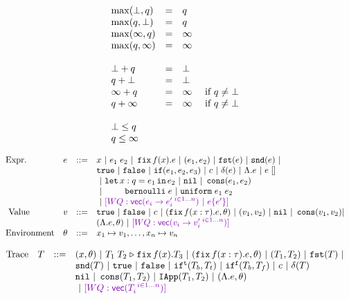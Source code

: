 \[\begin{array}{lcl}
\max(\bot, \nnatbiA) & = & \nnatbiA \\
\max(\nnatbiA, \bot) & = & \nnatbiA \\
\max(\infty, \nnatbiA) & = & \infty \\
\max(\nnatbiA, \infty) & = & \infty \\
\\
%
\bot + \nnatbiA & = & \bot \\
\nnatbiA + \bot & = & \bot \\
\infty + \nnatbiA & = & \infty ~~~~ \mbox{if } \nnatbiA \neq \bot \\
\nnatbiA + \infty & = & \infty ~~~~ \mbox{if } \nnatbiA \neq \bot \\
\\
%
\bot \leq \nnatbiA \\
\nnatbiA \leq \infty
\end{array}
\]

\[\begin{array}{llll}
\mbox{Expr.} & \expr & ::= & x ~|~ \expr_1 \eapp \expr_2 ~|~ \efix f(x).\expr
 ~|~ (\expr_1, \expr_2) ~|~ \eprojl(\expr) ~|~ \eprojr(\expr) ~| \\
%
& & & \etrue ~|~ \efalse ~|~ \eif(\expr_1, \expr_2, \expr_3) ~|~
\econst ~|~ \eop(\expr)  ~|~  {\eilam \expr ~|~ \expr \eapp [] } \\
& & & ~|~  {\elet  x:q = \expr_1 \ein \expr_2 } ~|~ \enil ~|~  \econs (
      \expr_1, \expr_2) \\
& & & ~|~ { ~~~~~~~
 \bernoulli \eapp \expr ~|~ \uniform \eapp \expr_1 \eapp
      \expr_2 } \\
& & & ~|~  \wq{ \mathsf{vec}(\expr_i \to \expr_i'^{\, \, i \in 1\dots n})  ~|~ \expr \{ \expr' \}  } \\\
%
\mbox{Value} & \valr & ::= & \etrue ~|~ \efalse ~|~ \econst ~|~
(\efix f(x:\type).\expr, \env) ~|~ (\valr_1, \valr_2) 
    ~|~ \enil ~|~ \econs (\valr_1, \valr_2) | \\
& & & {(\eilam \expr , \env) } ~|~ \wq{ \mathsf{vec}(\valr_i \to \valr_i'^{\, \, i \in 1\dots n} )  } \\
%
\mbox{Environment} & \env & ::= & x_1 \mapsto \valr_1, \ldots, x_n \mapsto \valr_n
\end{array}\]


\[\begin{array}{llll}
\mbox{Trace} & \tr & ::= &  {(x, \env)} ~|~ \trapp{\tr_1}{\tr_2}{f}{x}{\tr_3} ~|~
{ (\trfix f(x:\type).e, \env) } ~|~ (\tr_1, \tr_2) ~|~ \trprojl(\tr) ~|\\ 
%
& & & \trprojr(\tr) ~|~ \trtrue ~|~ \trfalse ~|~ \trift(\tr_b, \tr_t)
~|~ \triff(\tr_b, \tr_f) ~|~ \trconst ~|~ \trop(\tr) \\
%
& & & \trnil ~|~ \trcons (\tr_1, \tr_2) ~|~ \triapp{\tr_1}{\tr_2} ~|~
       {(\eilam \expr, \env)} \\
& & & ~|~  \wq { \mathsf{vec}(\tr_i ^{\, \, i \in 1\dots n}) } \\
\end{array}\]



